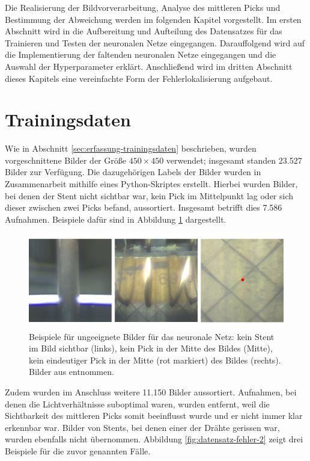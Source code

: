 Die Realisierung der Bildvorverarbeitung, Analyse des mittleren Picks und Bestimmung der Abweichung werden im folgenden Kapitel vorgestellt. Im ersten Abschnitt wird in die Aufbereitung und Aufteilung des Datensatzes für das Trainieren und Testen der neuronalen Netze eingegangen. Darauffolgend wird auf die Implementierung der faltenden neuronalen Netze eingegangen und die Auswahl der Hyperparameter erklärt. Anschließend wird im dritten Abschnitt dieses Kapitels eine vereinfachte Form der Fehlerlokalisierung aufgebaut.


\section{Trainingsdaten}
Wie in Abschnitt \ref{sec:erfassung-trainingsdaten} beschrieben, wurden vorgeschnittene Bilder der Größe $450 \times 450$ verwendet; insgesamt standen 23.527 Bilder zur Verfügung. Die dazugehörigen Labels der Bilder wurden in Zusammenarbeit mithilfe eines Python-Skriptes erstellt. Hierbei wurden Bilder, bei denen der Stent nicht sichtbar war, kein Pick im Mittelpunkt lag oder sich dieser zwischen zwei Picks befand, aussortiert. Insgesamt betrifft dies 7.586 Aufnahmen. Beispiele dafür sind in Abbildung \ref{fig:datensatz-fehler-1} dargestellt. 

\begin{figure}[h!]
\centering
\includegraphics[width=12cm]{98_images/datensatz_bsp1.png}
\caption{Beispiele für ungeeignete Bilder für das neuronale Netz: kein Stent im Bild sichtbar (links), kein Pick in der Mitte des Bildes (Mitte), kein eindeutiger Pick in der Mitte (rot markiert) des Bildes (rechts). Bilder aus \cite{flechtmaschine} entnommen.}
\label{fig:datensatz-fehler-1}
\end{figure}

\mypar Zudem wurden im Anschluss weitere 11.150 Bilder aussortiert. Aufnahmen, bei denen die Lichtverhältnisse suboptimal waren, wurden entfernt, weil die Sichtbarkeit des mittleren Picks somit beeinflusst wurde und er nicht immer klar erkennbar war. Bilder von Stents, bei denen einer der Drähte gerissen war, wurden ebenfalls nicht übernommen. Abbildung \ref{fig:datensatz-fehler-2} zeigt drei Beispiele für die zuvor genannten Fälle. 

